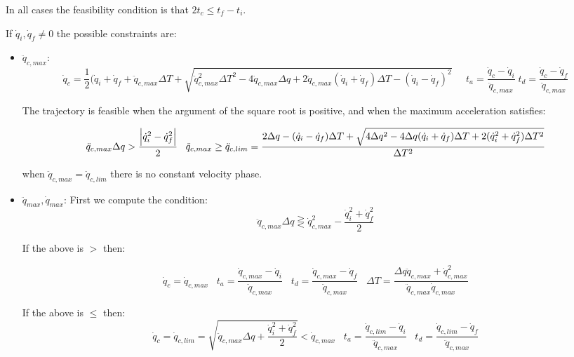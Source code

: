 In all cases the feasibility condition is that $2t_c\leq t_f-t_i$.

If $\dot q_i,\dot q_f\neq 0$ the possible constraints are:

\begin{itemize}
\item $\ddot q_{c,max}$:
\begin{equation*}
\dot q_c = \frac{1}{2}(\dot q_i+\dot q_f+\ddot q_{c,max}\Delta T+\sqrt{\ddot q_{c,max}^2\Delta T^2-4\ddot q_{c,max}\Delta q+2\ddot q_{c,max}(\dot q_i+\dot q_f)\Delta T-(\dot q_i-\dot q_f)^2}\;\;\;\;\;t_a=\frac{\dot q_c-\dot q_i}{\ddot q_{c,max}}\;t_d=\frac{\dot q_c-\dot q_f}{\ddot q_{c,max}}
\end{equation*}

The trajectory is feasible when the argument of the square root is positive, and when the maximum acceleration satisfies:

\begin{equation*}
\ddot q_{c,max}\Delta q>\frac{\abs{\dot q_i^2-\dot q_f^2}}{2}\;\;\;\ddot q_{c,max}\geq\ddot q_{c,lim}=\frac{2\Delta q-(\dot q_i-\dot q_f)\Delta T+\sqrt{4\Delta q^2-4\Delta q(\dot q_i+\dot q_f)\Delta T+2(\dot q_i^2+\dot q_f^2)\Delta T^2}}{\Delta T^2}
\end{equation*}

when $\ddot q_{c,max}=\ddot q_{c,lim}$ there is no constant velocity phase.
\item $\ddot q_{max},\dot q_{max}$:
First we compute the condition:
\begin{equation*}
\ddot q_{c,max}\Delta q\gtreqless\dot q_{c,max}^2-\frac{\dot q_i^2+\dot q_f^2}{2}
\end{equation*}

If the above is $>$ then:

\begin{equation*}
\dot q_c=\dot q_{c,max}\;\;\;t_a=\frac{\dot q_{c,max}-\dot q_i}{\ddot q_{c,max}}\;\;\;t_d=\frac{\dot q_{c,max}-\dot q_f}{\ddot q_{c,max}}\;\;\;\Delta T=\frac{\Delta q\ddot q_{c,max}+\dot q_{c,max}^2}{\ddot q_{c,max}\dot q_{c,max}}
\end{equation*}

If the above is $\leq$ then:
\begin{equation*}
\dot q_c=\dot q_{c,lim}=\sqrt{\ddot q_{c,max}\Delta q+\frac{\dot q_i^2+\dot q_f^2}{2}}<\dot q_{c,max}\;\;\;t_a=\frac{\dot q_{c,lim}-\dot q_i}{\ddot q_{c,max}}\;\;\;t_d=\frac{\dot q_{c,lim}-\dot q_f}{\ddot q_{c,max}}
\end{equation*}
\end{itemize}

